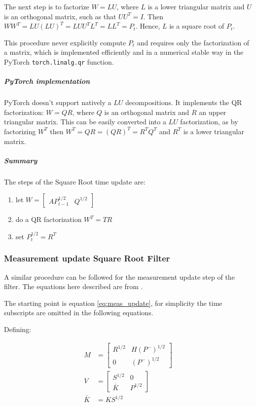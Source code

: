 \documentclass{article}
\begin{document}
The next step is to factorize  $W=LU$, where $L$ is a lower triangular matrix and $U$ is an orthogonal matrix, such as that $UU^T = I$. Then $WW^T = LU(LU)^T = LUU^TL^T = LL^T=P_t$. Hence, $L$ is a square root of $P_t$.

This procedure never explicitly compute $P_t$ and requires only the factorization of a matrix, which is implemented efficiently and in a numerical stable way in the PyTorch \verb|torch.linalg.qr| function. 

\subparagraph{PyTorch implementation} PyTorch doesn't support natively a $LU$ decompositions. It implements the QR factorization: $W=QR$, where $Q$ is an orthogonal matrix and $R$ an upper triangular matrix. This can be easily converted into a $LU$ factorization, as by factorizing $W^T$ then $W^T=QR=(QR)^T=R^TQ^T$ and $R^T$ is a lower triangular matrix.

\subparagraph{Summary} The steps of the Square Root time update are:

\begin{enumerate}
    \item let  $W = \begin{bmatrix}AP_{t-1}^{1/2} & Q^{1/2}\end{bmatrix}$
    \item do a QR factorization $W^T=TR$
    \item set $P_t^{1/2} = R^T$
\end{enumerate}

\subsubsection{Measurement update Square Root Filter}

A similar procedure can be followed for the measurement update step of the filter. The equations here described are from \cite{dan_simon_optimal_2006}.

The starting point is equation \ref{eq:meas_update}, for simplicity the time subscripts are omitted in the following equations.

Defining:

\begin{align}
    M &= \begin{bmatrix} R^{1/2} & H(P^-)^{1/2} \\ 0 & (P^-)^{1/2} \end{bmatrix} \\
    V &= \begin{bmatrix} S^{1/2} & 0 \\ \bar{K} & P^{1/2} \end{bmatrix} \\
    \bar{K} &= KS^{1/2}
\end{align}
    
\end{document}
